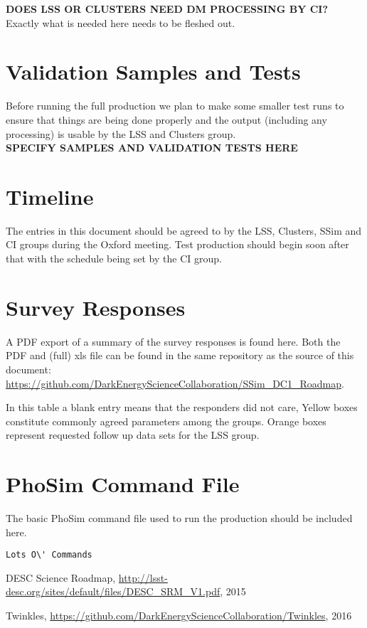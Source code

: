 \documentclass[12pt,letterpaper]{article}
\begin{document}
\noindent
{\bf DOES LSS OR CLUSTERS NEED DM PROCESSING BY CI?} \\
 
\noindent
Exactly what is needed here needs to be fleshed out.

\section{Validation Samples and Tests}

Before running the full production we plan to make some smaller test
runs to ensure that things are being done properly and the output
(including any processing) is usable by the LSS and Clusters group. \\


\noindent
{\bf SPECIFY SAMPLES AND VALIDATION TESTS HERE}


\section{Timeline}

The entries in this document should be agreed to by the LSS, Clusters,
SSim and CI groups during the Oxford meeting.  Test production should
begin soon after that with the schedule being set by the CI group.

\begin{appendices}

\section{Survey Responses}
\label{sec:survey}

A PDF export of a summary of the survey responses is found here.  Both
the PDF and (full) xls file can be found in the same repository as the
source of this document:
\url{https://github.com/DarkEnergyScienceCollaboration/SSim_DC1_Roadmap}.

In this table a blank entry means that the responders did not care,
Yellow boxes constitute commonly agreed parameters among the groups.
Orange boxes represent requested follow up data sets for the LSS group.

 

\section{PhoSim Command File}
\label{sec:command-file}

The basic PhoSim command file used to run the production should be
included here.

\begin{verbatim}
Lots O\' Commands
\end{verbatim}

\end{appendices}

\begin{thebibliography}{100}

DESC Science Roadmap,
\url{http://lsst-desc.org/sites/default/files/DESC_SRM_V1.pdf}, 2015

 Twinkles,
  \url{https://github.com/DarkEnergyScienceCollaboration/Twinkles},
  2016

\end{thebibliography}
\end{document}

